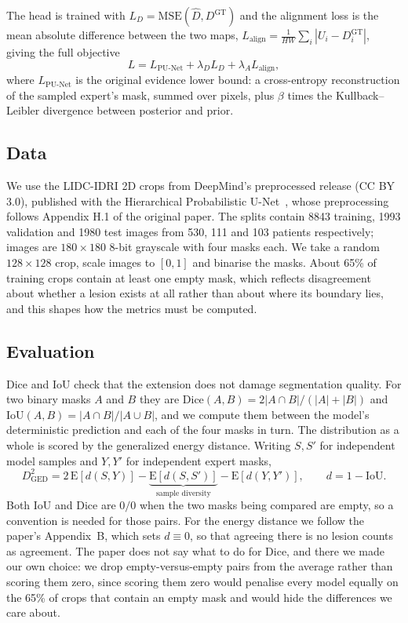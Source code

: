 \documentclass[10pt]{article}
\newcommand{\Dgt}{D^{\mathrm{GT}}}
\begin{document}
The head is trained with $L_D=\mathrm{MSE}(\hat D,\Dgt)$ and the alignment loss is
the mean absolute difference between the two maps,
$L_{\text{align}}=\frac{1}{HW}\sum_i|U_i-\Dgt_i|$, giving the full objective
\[
  L = L_{\text{PU-Net}} + \lambda_D L_D + \lambda_A L_{\text{align}},
\]
where $L_{\text{PU-Net}}$ is the original evidence lower bound: a cross-entropy
reconstruction of the sampled expert's mask, summed over pixels, plus
$\beta$ times the Kullback--Leibler divergence between posterior and prior.

\subsection{Data}

We use the LIDC-IDRI 2D crops from DeepMind's preprocessed release (CC BY 3.0),
published with the Hierarchical Probabilistic U-Net~\cite{kohl2019}, whose
preprocessing follows Appendix H.1 of the original paper. The splits contain 8843
training, 1993 validation and 1980 test images from 530, 111 and 103 patients
respectively; images are $180\times180$ 8-bit grayscale with four masks each. We
take a random $128\times128$ crop, scale images to $[0,1]$ and binarise the
masks. About 65\% of training crops contain at least one empty mask, which
reflects disagreement about whether a lesion exists at all rather than about
where its boundary lies, and this shapes how the metrics must be computed.

\subsection{Evaluation}

Dice and IoU check that the extension does not damage segmentation quality. For
two binary masks $A$ and $B$ they are
$\mathrm{Dice}(A,B)=2|A\cap B|/(|A|+|B|)$ and
$\mathrm{IoU}(A,B)=|A\cap B|/|A\cup B|$, and we compute them between the model's
deterministic prediction and each of the four masks in turn. The distribution as
a whole is scored by the generalized energy distance. Writing $S,S'$ for
independent model samples and $Y,Y'$ for independent expert masks,
\[
  D^2_{\mathrm{GED}}
  = 2\,\mathrm{E}\!\left[d(S,Y)\right]
    - \underbrace{\mathrm{E}\!\left[d(S,S')\right]}_{\text{sample diversity}}
    - \mathrm{E}\!\left[d(Y,Y')\right],
  \qquad d = 1-\mathrm{IoU} .
\]
Both IoU and Dice are $0/0$ when the two masks being compared are empty, so a
convention is needed for those pairs. For the energy distance we follow the
paper's Appendix~B, which sets $d\equiv0$, so that agreeing there is no lesion
counts as agreement. The paper does not say what to do for Dice, and there we
made our own choice: we drop empty-versus-empty pairs from the average rather
than scoring them zero, since scoring them zero would penalise every model
equally on the 65\% of crops that contain an empty mask and would hide the
differences we care about.
\end{document}
